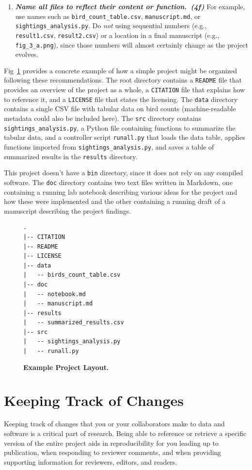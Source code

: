 \documentclass[10pt,letterpaper]{article}
\newcommand{\practicesection}[2]{\section{#1}\label{#2}}
\newcommand{\practice}[2]{\textbf{\emph{{#2}~({#1})}}}
\begin{document}
\begin{enumerate}
\item
  \practice{4f}{Name all files to reflect their content or function.} For
  example, use names such as \texttt{bird\_count\_table.csv},
  \texttt{manuscript.md}, or \texttt{sightings\_analysis.py}.  Do
  \emph{not} using sequential numbers (e.g., \texttt{result1.csv},
  \texttt{result2.csv}) or a location in a final manuscript (e.g.,
  \texttt{fig\_3\_a.png}), since those numbers will almost certainly
  change as the project evolves.

\end{enumerate}

Fig~\ref{fig:layout} provides a concrete example of how a
simple project might be organized following these recommendations. The
root directory contains a \texttt{README} file that provides an
overview of the project as a whole, a \texttt{CITATION} file that
explains how to reference it, and a \texttt{LICENSE} file that states the
licensing. The \texttt{data} directory contains a
single CSV file with tabular data on bird counts (machine-readable
metadata could also be included here). The \texttt{src} directory
contains \texttt{sightings\_analysis.py}, a Python file containing
functions to summarize the tabular data, and a controller script
\texttt{runall.py} that loads the data table, applies functions
imported from \texttt{sightings\_analysis.py}, and saves a table of
summarized results in the \texttt{results} directory.

This project doesn't have a \texttt{bin} directory, since it does not
rely on any compiled software. The \texttt{doc} directory contains two
text files written in Markdown, one containing a running lab notebook
describing various ideas for the project and how these were
implemented and the other containing a running draft of a manuscript
describing the project findings.

\begin{figure}
\caption{\textbf{Example Project Layout.}}
{\small
\begin{verbatim}
.
|-- CITATION
|-- README
|-- LICENSE
|-- data
|   -- birds_count_table.csv
|-- doc
|   -- notebook.md
|   -- manuscript.md
|-- results
|   -- summarized_results.csv
|-- src
|   -- sightings_analysis.py
|   -- runall.py
\end{verbatim}
}
\label{fig:layout}
\end{figure}

\practicesection{Keeping Track of Changes}{sec:versioning}

Keeping track of changes that you or your collaborators make to data
and software is a critical part of research. Being able to reference or
retrieve a specific version of the entire project aids in reproducibility
for you leading up to publication, when responding to reviewer comments,
and when providing supporting information for reviewers, editors,
and readers.
\end{document}
